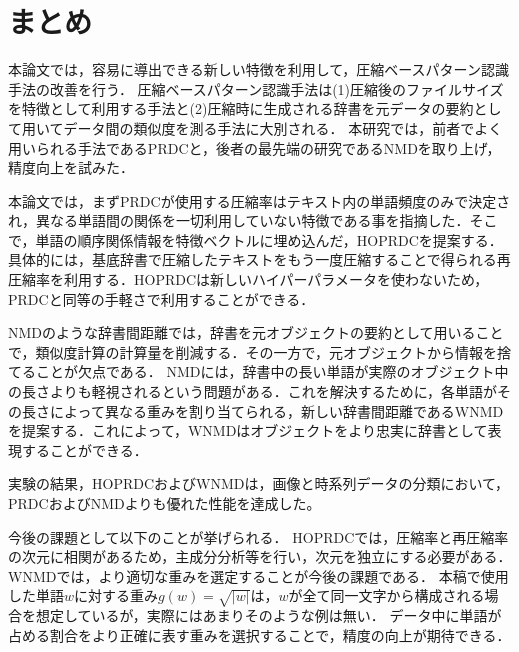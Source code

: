\chapter{まとめ}
本論文では，容易に導出できる新しい特徴を利用して，圧縮ベースパターン認識手法の改善を行う．
圧縮ベースパターン認識手法は(1)圧縮後のファイルサイズを特徴として利用する手法と(2)圧縮時に生成される辞書を元データの要約として用いてデータ間の類似度を測る手法に大別される．
本研究では，前者でよく用いられる手法であるPRDCと，後者の最先端の研究であるNMDを取り上げ，精度向上を試みた．

本論文では，まずPRDCが使用する圧縮率はテキスト内の単語頻度のみで決定され，異なる単語間の関係を一切利用していない特徴である事を指摘した．そこで，単語の順序関係情報を特徴ベクトルに埋め込んだ，HOPRDCを提案する．具体的には，基底辞書で圧縮したテキストをもう一度圧縮することで得られる再圧縮率を利用する．HOPRDCは新しいハイパーパラメータを使わないため，PRDCと同等の手軽さで利用することができる．


NMDのような辞書間距離では，辞書を元オブジェクトの要約として用いることで，類似度計算の計算量を削減する．その一方で，元オブジェクトから情報を捨てることが欠点である．
NMDには，辞書中の長い単語が実際のオブジェクト中の長さよりも軽視されるという問題がある．これを解決するために，各単語がその長さによって異なる重みを割り当てられる，新しい辞書間距離であるWNMDを提案する．これによって，WNMDはオブジェクトをより忠実に辞書として表現することができる．

実験の結果，HOPRDCおよびWNMDは，画像と時系列データの分類において，PRDCおよびNMDよりも優れた性能を達成した。

今後の課題として以下のことが挙げられる．
HOPRDCでは，圧縮率と再圧縮率の次元に相関があるため，主成分分析等を行い，次元を独立にする必要がある．
WNMDでは，より適切な重みを選定することが今後の課題である．
本稿で使用した単語$w$に対する重み$g(w)=\sqrt{|w|}$は，$w$が全て同一文字から構成される場合を想定しているが，実際にはあまりそのような例は無い．
データ中に単語が占める割合をより正確に表す重みを選択することで，精度の向上が期待できる．

